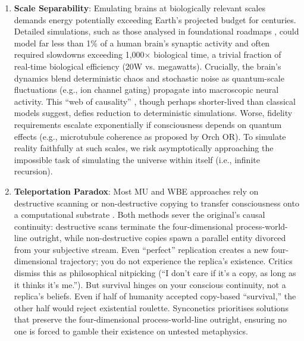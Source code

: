\documentclass[10pt]{article}
\begin{document}
\begin{sloppypar}
\begin{enumerate}
    \item \textbf{Scale Separability}: Emulating brains at biologically relevant scales demands energy potentially exceeding Earth’s projected budget for centuries. Detailed simulations, such as those analysed in foundational roadmaps \citep{bostrom_whole_2008}, could model far less than 1\% of a human brain’s synaptic activity and often required slowdowns exceeding 1,000\(\times\) biological time, a trivial fraction of real-time biological efficiency (20W vs. megawatts). Crucially, the brain’s dynamics blend deterministic chaos and stochastic noise as quantum-scale fluctuations (e.g., ion channel gating) propagate into macroscopic neural activity. This “web of causality” \citep{watanabe_biological_2022}, though perhaps shorter-lived than classical models suggest, defies reduction to deterministic simulations. Worse, fidelity requirements escalate exponentially if consciousness depends on quantum effects (e.g., microtubule coherence as proposed by Orch OR). To simulate reality faithfully at such scales, we risk asymptotically approaching the impossible task of simulating the universe within itself (i.e., infinite recursion).

    \item \textbf{Teleportation Paradox}: Most MU and WBE approaches rely on destructive scanning or non-destructive copying to transfer consciousness onto a computational substrate \citep{wiley_taxonomy_2014}. Both methods sever the original’s causal continuity: destructive scans terminate the four-dimensional process-world-line outright, while non-destructive copies spawn a parallel entity divorced from your subjective stream. Even “perfect” replication creates a new four-dimensional trajectory; you do not experience the replica’s existence. Critics dismiss this as philosophical nitpicking (“I don’t care if it’s a copy, as long as it thinks it’s me.”). But survival hinges on your conscious continuity, not a replica’s beliefs. Even if half of humanity accepted copy-based “survival,” the other half would reject existential roulette. Synconetics prioritises solutions that preserve the four-dimensional process-world-line outright, ensuring no one is forced to gamble their existence on untested metaphysics.
  \end{enumerate}


\end{sloppypar}
\end{document}
